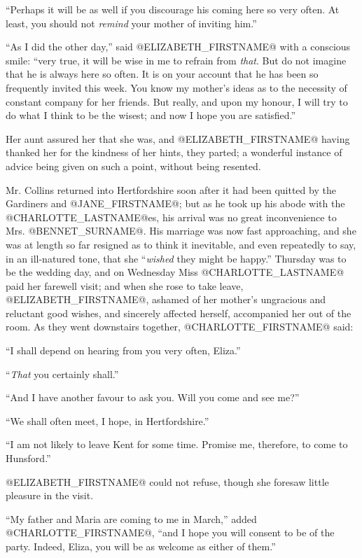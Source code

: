 ``Perhaps it will be as well if you discourage his coming here so very
often. At least, you should not \textit{remind} your mother of inviting him.''

``As I did the other day,'' said @ELIZABETH_FIRSTNAME@ with a conscious smile: ``very
true, it will be wise in me to refrain from \textit{that}. But do not imagine
that he is always here so often. It is on your account that he has been
so frequently invited this week. You know my mother's ideas as to the
necessity of constant company for her friends. But really, and upon my
honour, I will try to do what I think to be the wisest; and now I hope
you are satisfied.''

Her aunt assured her that she was, and @ELIZABETH_FIRSTNAME@ having thanked her for
the kindness of her hints, they parted; a wonderful instance of advice
being given on such a point, without being resented.

Mr. Collins returned into Hertfordshire soon after it had been quitted
by the Gardiners and @JANE_FIRSTNAME@; but as he took up his abode with the @CHARLOTTE_LASTNAME@es,
his arrival was no great inconvenience to Mrs. @BENNET_SURNAME@. His marriage was
now fast approaching, and she was at length so far resigned as to think
it inevitable, and even repeatedly to say, in an ill-natured tone, that
she ``\textit{wished} they might be happy.'' Thursday was to be the wedding day,
and on Wednesday Miss @CHARLOTTE_LASTNAME@ paid her farewell visit; and when she
rose to take leave, @ELIZABETH_FIRSTNAME@, ashamed of her mother's ungracious and
reluctant good wishes, and sincerely affected herself, accompanied her
out of the room. As they went downstairs together, @CHARLOTTE_FIRSTNAME@ said:

``I shall depend on hearing from you very often, Eliza.''

``\textit{That} you certainly shall.''

``And I have another favour to ask you. Will you come and see me?''

``We shall often meet, I hope, in Hertfordshire.''

``I am not likely to leave Kent for some time. Promise me, therefore, to
come to Hunsford.''

@ELIZABETH_FIRSTNAME@ could not refuse, though she foresaw little pleasure in the
visit.

``My father and Maria are coming to me in March,'' added @CHARLOTTE_FIRSTNAME@, ``and I
hope you will consent to be of the party. Indeed, Eliza, you will be as
welcome as either of them.''

